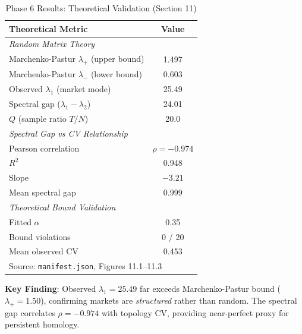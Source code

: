 \documentclass[12pt,letterpaper]{article}
\begin{document}
\begin{table}[H]
\centering
\caption{Phase 6 Results: Theoretical Validation (Section 11)}
\label{tab:phase6}
\begin{tabular}{@{}lc@{}}
\toprule
\textbf{Theoretical Metric} & \textbf{Value} \\
\midrule
\multicolumn{2}{l}{\textit{Random Matrix Theory}} \\
\quad Marchenko-Pastur $\lambda_+$ (upper bound) & 1.497 \\
\quad Marchenko-Pastur $\lambda_-$ (lower bound) & 0.603 \\
\quad Observed $\lambda_1$ (market mode) & 25.49 \\
\quad Spectral gap ($\lambda_1 - \lambda_2$) & 24.01 \\
\quad $Q$ (sample ratio $T/N$) & 20.0 \\
\midrule
\multicolumn{2}{l}{\textit{Spectral Gap vs CV Relationship}} \\
\quad Pearson correlation & $\rho = -0.974$ \\
\quad $R^2$ & 0.948 \\
\quad Slope & $-3.21$ \\
\quad Mean spectral gap & 0.999 \\
\midrule
\multicolumn{2}{l}{\textit{Theoretical Bound Validation}} \\
\quad Fitted $\alpha$ & 0.35 \\
\quad Bound violations & 0 / 20 \\
\quad Mean observed CV & 0.453 \\
\bottomrule
\multicolumn{2}{l}{\footnotesize Source: \texttt{manifest.json}, Figures 11.1--11.3}
\end{tabular}
\end{table}

\textbf{Key Finding}: Observed $\lambda_1 = 25.49$ far exceeds Marchenko-Pastur bound ($\lambda_+ = 1.50$), confirming markets are \textit{structured} rather than random. The spectral gap correlates $\rho = -0.974$ with topology CV, providing near-perfect proxy for persistent homology.
\end{document}
